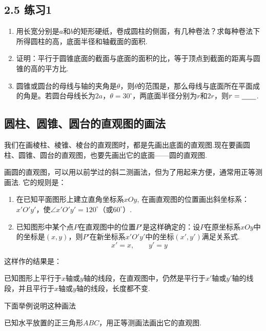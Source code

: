 \subsection*{2.5 练习1}
\begin{enumerate}
\item 用长宽分别是$a$和$b$的矩形硬纸，卷成圆柱的侧面，有几种卷法？求每种卷法下所得圆柱的高，底面半径和轴截面的面积.
\item 证明：平行于圆锥底面的截面与底面的面积的比，等于顶点到截面的距离与圆锥的高的平方比.
\item 圆锥或圆台的母线与轴的夹角是$\theta$，则$\theta$的范围是\blank，那么母线与底面所在平面成的角是\blank。若圆台母线长为$2a$，$\theta=30^{\circ}$，两底面半径分别为$r$和$2r$，则$r=\underline{\qquad}$.
\end{enumerate}

\subsection{圆柱、圆锥、圆台的直观图的画法}
我们在画棱柱、棱锥、棱台的直观图时，都是先画出底面的直观图.现在要画圆柱、圆锥、圆台的直观图，也要先画出它的底面——圆的直观图.

画圆的直观图，可以用以前学过的斜二测画法，但为了用起来方便，通常用正等测画法. 它的规则是：
\begin{enumerate}[(1)]
\item 在已知平面图形上建立直角坐标系$xOy$, 在画直观图的位置画出斜坐标系：$x'O'y'$，使$\angle x'O'y'=120^{\circ}$（或$60^{\circ}$）.
\item 已知图形中某个点$P$在直观图中的位置$P'$是这样确定的：设$P$在原坐标系$xOy$中的坐标是$(x,y)$，则$P'$在新坐标系$x'O'y'$中的坐标$(x',y')$满足关系式.
\[x'=x,\qquad y'=y\]
\end{enumerate}

这样作的结果是：

已知图形上平行于$x$轴或$y$轴的线段，在直观图中，仍然是平行于$x'$轴或$y'$轴的线段，并且平行于$x$轴或$y$轴的线段，长度都不变.

下面举例说明这种画法

\begin{example}
    已知水平放置的正三角形$ABC$，用正等测画法画出它的直观图.
\end{example}


